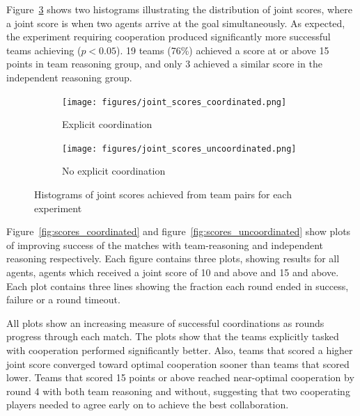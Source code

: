 Figure~\ref{fig:joint_scores} shows two histograms illustrating the distribution of joint scores, where a joint score is when two agents arrive at the goal simultaneously. As expected, the experiment requiring cooperation produced significantly more successful teams achieving ($p < 0.05$). 19 teams (76\%) achieved a score at or above 15 points in team reasoning group, and only 3 achieved a similar score in the independent reasoning group.

\begin{figure}
\centering
\begin{subfigure}{.5\textwidth}
\centering
\texttt{[image: figures/joint\_scores\_coordinated.png]}
\caption{Explicit coordination}
\label{fig:joint_scores_coordinated}
\end{subfigure}%
\begin{subfigure}{.5\textwidth}
\centering
\texttt{[image: figures/joint\_scores\_uncoordinated.png]}
\caption{No explicit coordination}
\label{fig:joint_scores_uncoordinated}
\end{subfigure}
\caption{Histograms of joint scores achieved from team pairs for each experiment}
\label{fig:joint_scores}
\end{figure}

Figure~\ref{fig:scores_coordinated} and figure~\ref{fig:scores_uncoordinated} show plots of improving success of the matches with team-reasoning and independent reasoning respectively. Each figure contains three plots, showing results for all agents, agents which received a joint score of 10 and above and 15 and above. Each plot contains three lines showing the fraction each round ended in success, failure or a round timeout. 

All plots show an increasing measure of successful coordinations as rounds progress through each match. The plots show that the teams explicitly tasked with cooperation performed significantly better. Also, teams that scored a higher joint score converged toward optimal cooperation sooner than teams that scored lower. Teams that scored 15 points or above reached near-optimal cooperation by round 4 with both team reasoning and without, suggesting that two cooperating players needed to agree early on to achieve the best collaboration.


